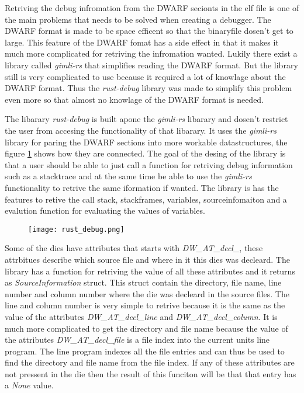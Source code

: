 
Retriving the debug infromation from the \gls{DWARF} secionts in the \gls{elf} file is one of the main problems that needs to be solved when creating a debugger.
The \gls{DWARF} format is made to be space efficent so that the binaryfile dosen't get to large.
This feature of the \gls{DWARF} fomat has a side effect in that it makes it much more complicated for retriving the infromation wanted.
Lukily there exist a library called \emph{gimli-rs} that simplifies reading the \gls{DWARF} format.
But the library still is very complicated to use because it required a lot of knowlage about the \gls{DWARF} format.
Thus the \emph{rust-debug} library was made to simplify this problem even more so that almost no knowlage of the \gls{DWARF} format is needed.


The libarary \emph{rust-debug} is built apone the \emph{gimli-rs} libarary and dosen't restrict the user from accesing the functionality of that libarary.
It uses the \emph{gimli-rs} library for paring the \gls{DWARF} sections into more workable datastructures, the figure \ref{fig:rustdebug} shows how they are connected.
The goal of the desing of the library is that a user should be able to just call a function for retriving debug information such as a stacktrace and at the same time be able to use the \emph{gimli-rs} functionality to retrive the same iformation if wanted.
The library is has the features to retive the call stack, stackframes, variables, sourceinfomaiton and a evalution function for evaluating the values of variables.


\begin{figure}[h]
    \centering
    \texttt{[image: rust\_debug.png]}
    \label{fig:rustdebug}
\end{figure}


Some of the dies have attributes that starts with \emph{DW\_AT\_decl\_}, these attrbitues describe which source file and where in it this dies was decleard.
The library has a function for retriving the value of all these attributes and it returns as \emph{SourceInformation} struct.
This struct contain the directory, file name, line number and column number where the die was decleard in the source files.
The line and column number is very simple to retrive because it is the same as the value of the attributes \emph{DW\_AT\_decl\_line} and \emph{DW\_AT\_decl\_column}.
It is much more complicated to get the directory and file name because the value of the attributes \emph{DW\_AT\_decl\_file} is a file index into the current units line program.
The line program indexes all the file entries and can thus be used to find the directory and file name from the file index.
If any of these attributes are not pressent in the die then the result of this funciton will be that that entry has a \emph{None} value.




